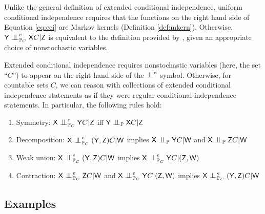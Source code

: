 Unlike the general definition of extended conditional independence, uniform conditional independence requires that the functions on the right hand side of Equation \ref{eq:eci} are Markov kernels (Definition \ref{def:mkern}). Otherwise, $\RV{Y}\CI^e_{\prob{P}_C} \RV{X} C|\RV{Z}$ is equivalent to the definition provided by \citet{constantinou_extended_2017}, given an appropriate choice of nonstochastic variables.



Extended conditional independence requires nonstochastic variables (here, the set ``$C$'') to appear on the right hand side of the $\CI^e$ symbol. Otherwise, for countable sets $C$, we can reason with collections of extended conditional independence statements as if they were regular conditional independence statements. In particular, the following rules hold:

\begin{enumerate}
    \item Symmetry: $\RV{X}\CI_{\prob{P}_C}^e \RV{Y} C|\RV{Z}$ iff $\RV{Y}\CI_{\prob{P}} \RV{X} C|\RV{Z}$
    \item Decomposition: $\RV{X}\CI_{\prob{P}_C}^e (\RV{Y},\RV{Z})C|\RV{W}$ implies $\RV{X}\CI_{\prob{P}}\RV{Y}C|\RV{W}$ and $\RV{X}\CI_{\prob{P}}\RV{Z}C|\RV{W}$
    \item Weak union: $\RV{X}\CI_{\prob{P}_C}^e(\RV{Y},\RV{Z})C|\RV{W}$ implies $\RV{X}\CI_{\prob{P}_C}^e\RV{Y}C|(\RV{Z},\RV{W})$
    \item Contraction: $\RV{X}\CI_{\prob{P}_C}^e\RV{Z}C|\RV{W}$ and $\RV{X}\CI_{\prob{P}_C}^e\RV{Y}C|(\RV{Z},\RV{W})$ implies $\RV{X}\CI_{\prob{P}_C}^e(\RV{Y},\RV{Z})C|\RV{W}$
\end{enumerate} 

\subsection{Examples}

